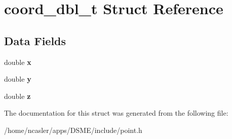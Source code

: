 \hypertarget{structcoord__dbl__t}{}\section{coord\+\_\+dbl\+\_\+t Struct Reference}
\label{structcoord__dbl__t}
\subsection*{Data Fields}
\begin{DoxyCompactItemize}
\item 
\hypertarget{structcoord__dbl__t_a9d03a2ed64ced526319933f016cfeb4c}{}double {\bfseries x}\label{structcoord__dbl__t_a9d03a2ed64ced526319933f016cfeb4c}

\item 
\hypertarget{structcoord__dbl__t_a32ade1f362b8f0ae140afd4d59dfe7b5}{}double {\bfseries y}\label{structcoord__dbl__t_a32ade1f362b8f0ae140afd4d59dfe7b5}

\item 
\hypertarget{structcoord__dbl__t_af53cc0c637a74448e0b49cbe153474f6}{}double {\bfseries z}\label{structcoord__dbl__t_af53cc0c637a74448e0b49cbe153474f6}

\end{DoxyCompactItemize}


The documentation for this struct was generated from the following file\+:\begin{DoxyCompactItemize}
\item 
/home/ncasler/apps/\+D\+S\+M\+E/include/point.\+h\end{DoxyCompactItemize}
